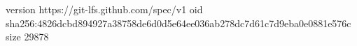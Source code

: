 version https://git-lfs.github.com/spec/v1
oid sha256:4826dcbd894927a38758de6d0d5e64ee036ab278dc7d61c7d9eba0e0881e576c
size 29878
